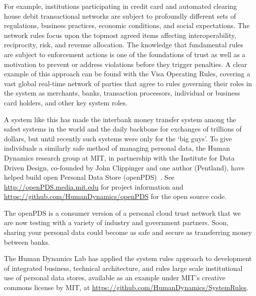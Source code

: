 For example, institutions participating in credit card and automated clearing house debit transactional networks are subject to profoundly different sets of regulations, business practices, economic conditions, and social expectations.
The network rules focus upon the topmost agreed items affecting interoperability, reciprocity, risk, and revenue allocation.
The knowledge that fundamental rules are subject to enforcement actions is one of the foundations of trust as well as a motivation to prevent or address violations before they trigger penalties. 
A clear example of this approach can be found with the Visa Operating Rules, covering a vast global real-time network of parties that agree to rules governing their roles in the system as merchants, banks, transaction processors, individual or business card holders, and other key system roles.

A system like this has made the interbank money transfer system among the safest systems in the world and the daily backbone for exchanges of trillions of dollars, but until recently such systems were only for the `big guys'.
To give individuals a similarly safe method of managing personal data, the Human Dynamics research group at MIT, in partnership with the Institute for Data Driven Design, co-founded by John Clippinger and one author (Pentland), have helped build open Personal Data Store (openPDS)~\cite{de2012trusted}. See \url{http://openPDS.media.mit.edu} for project information and \url{https://github.com/HumanDynamics/openPDS} for the open source code.

The openPDS is a consumer version of a personal cloud trust network that we are now testing with a variety of industry and government partners.
Soon, sharing your personal data could become as safe and secure as transferring money between banks.

The Human Dynamics Lab has applied the system rules approach to development of integrated business, technical architecture, and rules large scale institutional use of personal data stores, available as an example under MIT's creative commons license by MIT, at \url{https://github.com/HumanDynamics/SystemRules}. 

